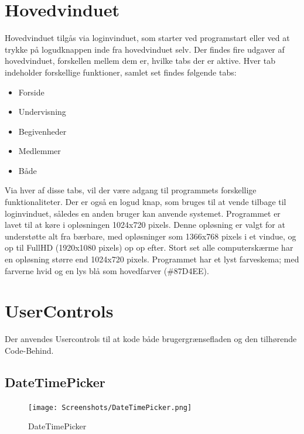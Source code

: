 \section{Hovedvinduet}
Hovedvinduet tilgås via loginvinduet, som starter ved programstart eller ved at trykke på logudknappen inde fra hovedvinduet selv. 
Der findes fire udgaver af hovedvinduet, forskellen mellem dem er, hvilke tabs der er aktive.
Hver tab indeholder forskellige funktioner, samlet set findes følgende tabs:
\begin{itemize}%
    \item Forside
    \item Undervisning
    \item Begivenheder
    \item Medlemmer
    \item Både
\end{itemize}

Via hver af disse tabs, vil der være adgang til programmets forskellige funktionaliteter.
Der er også en logud knap, som bruges til at vende tilbage til loginvinduet, således en anden bruger kan anvende systemet.
Programmet er lavet til at køre i opløsningen 1024x720 pixels.
Denne opløsning er valgt for at understøtte alt fra bærbare, med opløsninger som 1366x768 pixels i et vindue, og op til FullHD (1920x1080 pixels) op op efter. 
Stort set alle computerskærme har en opløsning større end 1024x720 pixels\citep{resolutions}. 
Programmet har et lyst farveskema; med farverne hvid og en lys blå som hovedfarver (\#87D4EE).

\section{UserControls}
Der anvendes Usercontrols til at kode både brugergrænsefladen og den tilhørende Code-Behind.

\subsection{DateTimePicker}\label{subsec:DateTimePicker}

\begin{figure}
    \label{img:DateTimePicker}
    \vspace{-20pt}
    \begin{center}
        \texttt{[image: Screenshots/DateTimePicker.png]}
    \end{center}
    \vspace{-15pt}
    \caption{DateTimePicker}
    \vspace{-30pt}
\end{figure}

